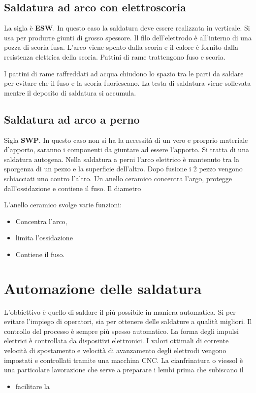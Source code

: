 \subsection{Saldatura ad arco con elettroscoria}
La sigla è \textbf{ESW}.
In questo caso la saldatura deve essere realizzata in verticale.
Si usa per produrre giunti di grosso spessore.
Il filo dell'elettrodo è all'interno di una pozza di scoria fusa.
L'arco viene spento dalla scoria e il calore è fornito dalla resistenza elettrica della scoria.
Pattini di rame trattengono fuso e scoria.

I pattini di rame raffreddati ad acqua chiudono lo spazio tra le parti da saldare per evitare che il fuso e la scoria fuoriescano.
La testa di saldatura viene sollevata mentre il deposito di saldatura si accumula.

\subsection{Saldatura ad arco a perno}
Sigla \textbf{SWP}.
In questo caso non si ha la necessità di un vero e prorprio materiale d'apporto, saranno i componenti da giuntare ad essere l'apporto.
Si tratta di una saldatura autogena.
Nella saldatura a perni l'arco elettrico è mantenuto tra la sporgenza di un pezzo e la superficie dell'altro.
Dopo fusione i 2 pezzo vengono schiacciati uno contro l'altro.
Un anello ceramico concentra l'argo, protegge dall'ossidazione e contiene il fuso.
Il diametro \todo{\\Aggiungi}


L'anello ceramico svolge varie funzioni:
\begin{itemize}
\item Concentra l'arco,
\item limita l'ossidazione 
\item Contiene il fuso.
\end{itemize}

\section{Automazione delle saldatura}
L'obbiettivo è quello di saldare il più possibile in maniera automatica.
Si per evitare l'impiego di operatori, sia per ottenere delle saldature a qualità migliori.
Il controllo del processo è sempre più spesso automatico. La forma degli impulsi elettrici è controllata da dispositivi elettronici.
I valori ottimali di corrente velocità di spostamento e velocità di avanzamento degli elettrodi vengono impostati e controllati tramite una macchina \ac{CNC}.
La cianfrinatura o viessol è una particolare lavorazione che serve a preparare i lembi prima che subiscano il
\begin{itemize}
\item facilitare la \todo{\\aggiungi}
\end{itemize}

